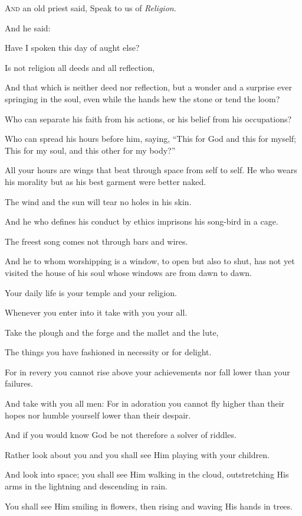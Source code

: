 \lettrine{A}{nd} an old priest said, Speak to us
of \textit{Religion}.

\medskip
And he said:

Have I spoken this day of aught else?

Is not religion all deeds and all
reflection,

And that which is neither deed nor
reflection, but a wonder and a surprise
ever springing in the soul, even while
the hands hew the stone or tend the
loom?

Who can separate his faith from
his actions, or his belief from his
occupations?

Who can spread his hours before him,
saying, “This for God and this for
myself; This for my soul, and this other
for my body?”

All your hours are wings that beat
through space from self to self. He
who wears his morality but as his best
garment were better naked.

The wind and the sun will tear no holes
in his skin.

And he who defines his conduct by ethics
imprisons his song-bird in a cage.

The freest song comes not through bars
and wires.

And he to whom worshipping is a window,
to open but also to shut, has not yet
visited the house of his soul whose
windows are from dawn to dawn.



Your daily life is your temple and your
religion.

Whenever you enter into it take with you
your all.

Take the plough and the forge and the
mallet and the lute,

The things you have fashioned in
necessity or for delight.

For in revery you cannot rise above your
achievements nor fall lower than your
failures.

And take with you all men: For in
adoration you cannot fly higher than
their hopes nor humble yourself lower
than their despair.



And if you would know God be not
therefore a solver of riddles.

Rather look about you and you shall see
Him playing with your children.

And look into space; you shall see Him
walking in the cloud, outstretching His
arms in the lightning and descending in
rain.

You shall see Him smiling in flowers,
then rising and waving His hands in
trees.

 
